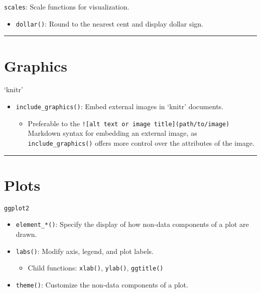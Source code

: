 \documentclass[]{book}
\providecommand{\tightlist}{%
  \setlength{\itemsep}{0pt}\setlength{\parskip}{0pt}}
\begin{document}
\texttt{scales}: Scale functions for visualization.

\begin{itemize}
\tightlist
\item
  \texttt{dollar()}: Round to the nearest cent and display dollar sign.
\end{itemize}

\begin{center}\rule{0.5\linewidth}{\linethickness}\end{center}

\hypertarget{graphics}{%
\section{Graphics}\label{graphics}}

`knitr'

\begin{itemize}
\tightlist
\item
  \texttt{include\_graphics()}: Embed external images in `knitr' documents.

  \begin{itemize}
  \tightlist
  \item
    Preferable to the \texttt{!{[}alt\ text\ or\ image\ title{]}(path/to/image)} Markdown syntax for embedding an external image, as \texttt{include\_graphics()} offers more control over the attributes of the image.
  \end{itemize}
\end{itemize}

\begin{center}\rule{0.5\linewidth}{\linethickness}\end{center}

\hypertarget{plots-1}{%
\section{Plots}\label{plots-1}}

\texttt{ggplot2}

\begin{itemize}
\tightlist
\item
  \texttt{element\_*()}: Specify the display of how non-data components of a plot are drawn.
\item
  \texttt{labs()}: Modify axis, legend, and plot labels.

  \begin{itemize}
  \tightlist
  \item
    Child functions: \texttt{xlab()}, \texttt{ylab()}, \texttt{ggtitle()}
  \end{itemize}
\item
  \texttt{theme()}: Customize the non-data components of a plot.
\end{itemize}
\end{document}
